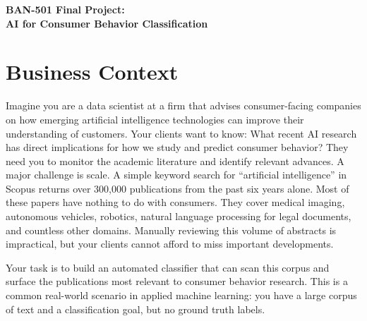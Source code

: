 \documentclass[11pt]{article}
\begin{document}
\begin{center}
	{\huge
	\textbf{BAN-501 Final Project:\\ AI for Consumer Behavior Classification}
}
\end{center}

\section*{Business Context}

Imagine you are a data scientist at a firm that advises consumer-facing companies on how emerging artificial intelligence technologies can improve their understanding of customers. Your clients want to know: What recent AI research has direct implications for how we study and predict consumer behavior? They need you to monitor the academic literature and identify relevant advances. A major challenge is scale. A simple keyword search for ``artificial intelligence'' in Scopus returns over 300,000 publications from the past six years alone. Most of these papers have nothing to do with consumers. They cover medical imaging, autonomous vehicles, robotics, natural language processing for legal documents, and countless other domains. Manually reviewing this volume of abstracts is impractical, but your clients cannot afford to miss important developments.

Your task is to build an automated classifier that can scan this corpus and surface the publications most relevant to consumer behavior research. This is a common real-world scenario in applied machine learning: you have a large corpus of text and a classification goal, but no ground truth labels.

%
\end{document}
